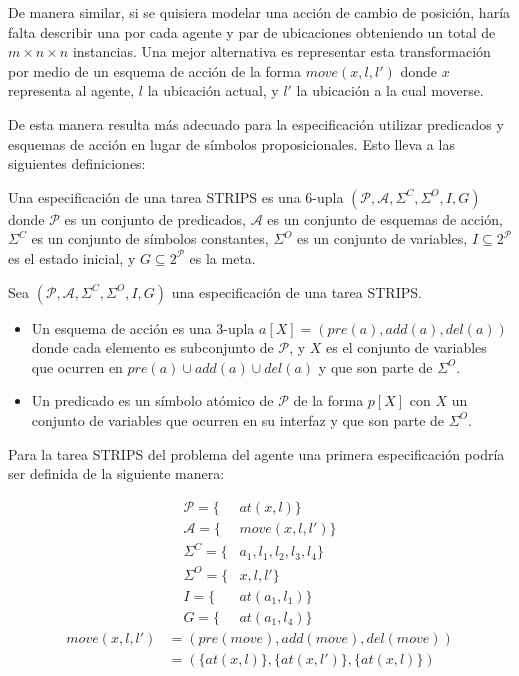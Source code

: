 De manera similar, si se quisiera modelar una acción de cambio de posición,
haría falta describir una por cada agente y par de ubicaciones obteniendo un
total de $m \times n \times n$ instancias. Una mejor alternativa es representar
esta transformación por medio de un esquema de acción de la forma $move(x, l,
l')$ donde $x$ representa al agente, $l$ la ubicación actual, y $l'$ la
ubicación a la cual moverse.

De esta manera resulta más adecuado para la especificación utilizar predicados y
esquemas de acción en lugar de símbolos proposicionales. Esto lleva a las
siguientes definiciones:

\begin{mydef}
    Una especificación de una tarea STRIPS es una 6-upla $(\mathcal{P},
    \mathcal{A}, \Sigma^{C}, \Sigma^{O}, I, G)$  donde $\mathcal{P}$ es un
    conjunto de predicados, $\mathcal{A}$ es un conjunto de esquemas de acción,
    $\Sigma^{C}$ es un conjunto de símbolos constantes, $\Sigma^{O}$ es un
    conjunto de variables, $I \subseteq 2^{\mathcal{P}}$ es el estado inicial, y
    $G \subseteq 2^{\mathcal{P}}$ es la meta.
\end{mydef}

\begin{mydef}
    Sea $(\mathcal{P}, \mathcal{A}, \Sigma^{C}, \Sigma^{O}, I, G)$ una
    especificación de una tarea STRIPS.

    \begin{itemize}
        \item Un esquema de acción es una 3-upla $a[X] = (pre(a), add(a),
        del(a))$ donde cada elemento es subconjunto de $\mathcal{P}$, y $X$ es
        el conjunto de variables que ocurren en $pre(a) \cup add(a) \cup del(a)$
        y que son parte de $\Sigma^{O}$.
        \item Un predicado es un símbolo atómico de $\mathcal{P}$ de la forma
        $p[X]$ con $X$ un conjunto de variables que ocurren en su interfaz y que
        son parte de $\Sigma^{O}$.
    \end{itemize}
\end{mydef}

Para la tarea STRIPS del problema del agente una primera especificación podría
ser definida de la siguiente manera:

\begin{align*}
    \mathcal{P} = \{&at(x, l)\} \\
    \mathcal{A} = \{&move(x, l, l')\} \\
    \Sigma^{C} = \{&a_1, l_1, l_2, l_3, l_4\} \\
    \Sigma^{O} = \{&x, l, l'\} \\
    I = \{&at(a_1, l_1)\} \\
    G = \{&at(a_1, l_4)\}
\end{align*}
\begin{align*}
    move(x, l, l') &= (pre(move), add(move), del(move)) \\
                   &= (\{at(x, l)\}, \{at(x, l')\},\{at(x, l)\})
\end{align*}

